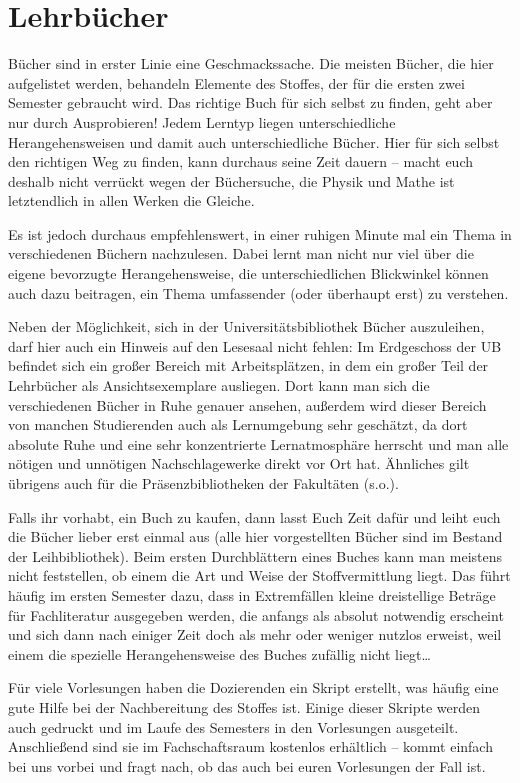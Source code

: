 \section{Lehrbücher}

Bücher sind in erster Linie eine Geschmackssache. Die meisten Bücher, die hier aufgelistet werden, behandeln Elemente des Stoffes, der für die ersten zwei Semester gebraucht wird. Das richtige Buch für sich selbst zu finden, geht aber nur durch Ausprobieren! Jedem Lerntyp liegen unterschiedliche Herangehensweisen und damit auch unterschiedliche Bücher. Hier für sich selbst den richtigen Weg zu finden, kann durchaus seine Zeit dauern -- macht euch deshalb nicht verrückt wegen der Büchersuche, die Physik und Mathe ist letztendlich in allen Werken die Gleiche.

Es ist jedoch durchaus empfehlenswert, in einer ruhigen Minute mal ein Thema in verschiedenen Büchern nachzulesen. Dabei lernt man nicht nur viel über die eigene bevorzugte Herangehensweise, die unterschiedlichen Blickwinkel können auch dazu beitragen, ein Thema umfassender (oder überhaupt erst) zu verstehen.

Neben der Möglichkeit, sich in der Universitätsbibliothek Bücher auszuleihen, darf hier auch ein Hinweis auf den Lesesaal nicht fehlen: Im Erdgeschoss der UB befindet sich ein großer Bereich mit Arbeitsplätzen, in dem ein großer Teil der Lehrbücher als Ansichtsexemplare ausliegen. Dort kann man sich die verschiedenen Bücher in Ruhe genauer ansehen, außerdem wird dieser Bereich von manchen Studierenden auch als Lernumgebung sehr geschätzt, da dort absolute Ruhe und eine sehr konzentrierte Lernatmosphäre herrscht und man alle nötigen und unnötigen Nachschlagewerke direkt vor Ort hat. Ähnliches gilt übrigens auch für die Präsenzbibliotheken der Fakultäten (s.o.).

Falls ihr vorhabt, ein Buch zu kaufen, dann lasst Euch Zeit dafür und leiht euch die Bücher lieber erst einmal aus (alle hier vorgestellten Bücher sind im Bestand der Leihbibliothek). Beim ersten Durchblättern eines Buches kann man meistens nicht feststellen, ob einem die Art und Weise der Stoffvermittlung liegt. Das führt häufig im ersten Semester dazu, dass in Extremfällen kleine dreistellige Beträge für Fachliteratur ausgegeben werden, die anfangs als absolut notwendig erscheint und sich dann nach einiger Zeit doch als mehr oder weniger nutzlos erweist, weil einem die spezielle Herangehensweise des Buches zufällig nicht liegt\dots

Für viele Vorlesungen haben die Dozierenden ein Skript erstellt, was häufig eine gute Hilfe bei der Nachbereitung des Stoffes ist. Einige dieser Skripte werden auch gedruckt und im Laufe des Semesters in den Vorlesungen ausgeteilt. Anschließend sind sie im Fachschaftsraum kostenlos erhältlich -- kommt einfach bei uns vorbei und fragt nach, ob das auch bei euren Vorlesungen der Fall ist.

